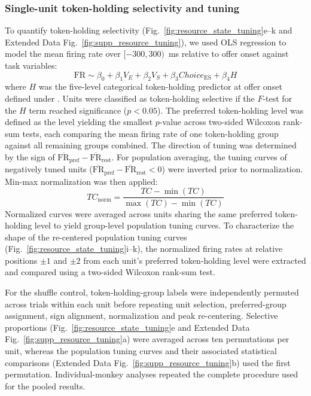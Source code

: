 \documentclass[pdflatex,sn-mathphys-num]{sn-jnl}%
\begin{document}
\subsubsection{Single-unit token-holding selectivity and tuning}\label{sec:m_tuning}
To quantify token-holding selectivity (Fig.~\ref{fig:resource_state_tuning}e--k and Extended Data Fig.~\ref{fig:supp_resource_tuning}), we used OLS regression to model the mean firing rate over $[-300,300)$~ms relative to offer onset against task variables:
\begin{equation}
    \mathrm{FR} \sim \beta_0 + \beta_1 V_E + \beta_2 V_S + \beta_3 \mathit{Choice}_{\mathrm{ES}} + \beta_4 H
    \label{eq:cat_wealth}
\end{equation}
where $H$ was the five-level categorical token-holding predictor at offer onset defined under . Units were classified as token-holding selective if the $F$-test for the $H$ term reached significance ($p<0.05$). The preferred token-holding level was defined as the level yielding the smallest $p$-value across two-sided Wilcoxon rank-sum tests, each comparing the mean firing rate of one token-holding group against all remaining groups combined. The direction of tuning was determined by the sign of $\overline{\mathrm{FR}}_{\mathrm{pref}} - \overline{\mathrm{FR}}_{\mathrm{rest}}$. For population averaging, the tuning curves of negatively tuned units ($\overline{\mathrm{FR}}_{\mathrm{pref}} - \overline{\mathrm{FR}}_{\mathrm{rest}} < 0$) were inverted prior to normalization. Min-max normalization was then applied:
\begin{equation}
    \mathit{TC}_{\mathrm{norm}} = \frac{\mathit{TC} - \min(\mathit{TC})}{\max(\mathit{TC}) - \min(\mathit{TC})}
\end{equation}
Normalized curves were averaged across units sharing the same preferred token-holding level to yield group-level population tuning curves. To characterize the shape of the re-centered population tuning curves (Fig.~\ref{fig:resource_state_tuning}i--k), the normalized firing rates at relative positions $\pm1$ and $\pm2$ from each unit's preferred token-holding level were extracted and compared using a two-sided Wilcoxon rank-sum test.

For the shuffle control, token-holding-group labels were independently permuted across trials within each unit before repeating unit selection, preferred-group assignment, sign alignment, normalization and peak re-centering. Selective proportions (Fig.~\ref{fig:resource_state_tuning}e and Extended Data Fig.~\ref{fig:supp_resource_tuning}a) were averaged across ten permutations per unit, whereas the population tuning curves and their associated statistical comparisons (Extended Data Fig.~\ref{fig:supp_resource_tuning}b) used the first permutation. Individual-monkey analyses repeated the complete procedure used for the pooled results.
\end{document}
